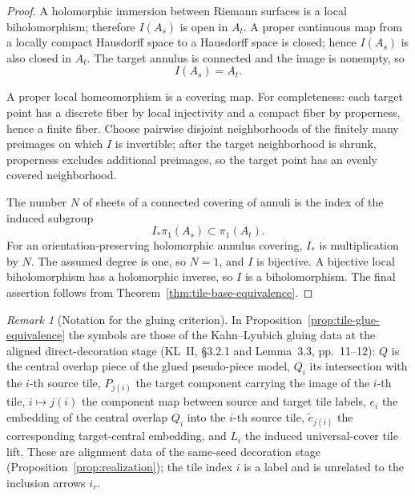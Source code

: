 \documentclass[11pt,reqno]{amsart}
\theoremstyle{definition}
\theoremstyle{remark}
\newtheorem{remark}[theorem]{Remark}
\begin{document}
\begin{proof}
A holomorphic immersion between Riemann surfaces is a local
biholomorphism; therefore \(I(A_s)\) is open in \(A_t\).  A proper
continuous map from a locally compact Hausdorff space to a Hausdorff
space is closed; hence \(I(A_s)\) is also closed in \(A_t\).  The
target annulus is connected and the image is nonempty, so
\[
 I(A_s)=A_t .
\]

A proper local homeomorphism is a covering map.  For completeness:
each target point has a discrete fiber by local injectivity and a
compact fiber by properness, hence a finite fiber.  Choose pairwise
disjoint neighborhoods of the finitely many preimages on which \(I\)
is invertible; after the target neighborhood is shrunk, properness
excludes additional preimages, so the target point has an evenly
covered neighborhood.

The number \(N\) of sheets of a connected covering of annuli is the
index of the induced subgroup
\[
 I_*\pi_1(A_s)\subset\pi_1(A_t).
\]
For an orientation-preserving holomorphic annulus covering, \(I_*\) is
multiplication by \(N\).  The assumed degree is one, so \(N=1\), and
\(I\) is bijective.  A bijective local biholomorphism has a
holomorphic inverse, so \(I\) is a biholomorphism.  The final
assertion follows from Theorem~\ref{thm:tile-base-equivalence}.
\end{proof}
\begin{remark}[Notation for the gluing criterion]\label{rem:tile-glue-notation}
In Proposition~\ref{prop:tile-glue-equivalence} the symbols are those
of the Kahn--Lyubich gluing data at the aligned direct-decoration
stage (KL~II, \S3.2.1 and Lemma~3.3, pp.~11--12): \(Q\) is the central
overlap piece of the glued pseudo-piece model, \(Q_i\) its
intersection with the \(i\)-th source tile, \(P_{j(i)}\) the target
component carrying the image of the \(i\)-th tile, \(i\mapsto j(i)\)
the component map between source and target tile labels, \(e_i\) the
embedding of the central overlap \(Q_i\) into the \(i\)-th source
tile, \(\widetilde e_{j(i)}\) the corresponding target-central
embedding, and \(L_i\) the induced universal-cover tile lift.  These
are alignment data of the same-seed decoration stage
(Proposition~\ref{prop:realization}); the tile index \(i\) is a label
and is unrelated to the inclusion arrows \(i_r\).
\end{remark}
\end{document}
